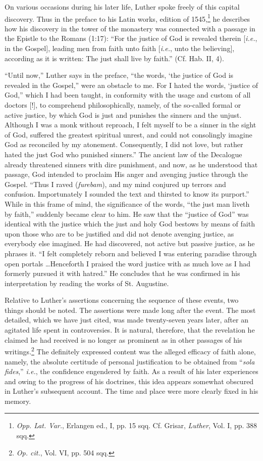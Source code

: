 On various occasions during his later life, Luther spoke freely
of this capital discovery. Thus in the preface to his Latin works,
edition of 1545,\footnote
{\textit{Opp. Lat. Var.}, Erlangen ed., I, pp. 15 sqq. Cf. Grisar, \textit{Luther}, Vol. I, pp. 388 sqq.}
he describes how his discovery in the tower of the
monastery was connected with a passage in the Epistle to the Romans
(1:17): “For the justice of God is revealed therein [\textit{i.e.}, in the
Gospel], leading men from faith unto faith [\textit{i.e.}, unto the believing],
according as it is written: The just shall live by faith.” (Cf. Hab. II, 4).

“Until now,” Luther says in the preface, “the words, ‘the justice
of God is revealed in the Gospel,” were an obstacle to me. For I hated
the words, ‘justice of God,” which I had been taught, in conformity
with the usage and custom of all doctors [!], to comprehend philosophically,
namely, of the so-called formal or active justice, by which
God is just and punishes the sinners and the unjust. Although I was
a monk without reproach, I felt myself to be a sinner in the sight of
God, suffered the greatest spiritual unrest, and could not consolingly
imagine God as reconciled by my atonement. Consequently, I did not
love, but rather hated the just God who punished sinners.” The ancient
law of the Decalogue already threatened sinners with dire punishment, and now, as he understood that passage, God intended to
proclaim His anger and avenging justice through the Gospel. “Thus
I raved (\textit{furebam}), and my mind conjured up terrors and confusion.
Importunately I sounded the text and thirsted to know its purport.”
While in this frame of mind, the significance of the words, “the just
man liveth by faith,” suddenly became clear to him. He saw that the
“justice of God” was identical with the justice which the just and
holy God bestows by means of faith upon those who are to be justified and
did not denote avenging justice, as everybody else imagined.
He had discovered, not active but passive justice, as he phrases it.
“I felt completely reborn and believed I was entering paradise
through open portals \dots Henceforth I praised the word justice
with as much love as I had formerly pursued it with hatred.” He
concludes that he was confirmed in his interpretation by reading the
works of St. Augustine.

Relative to Luther’s assertions concerning the sequence of these
events, two things should be noted. The assertions were made long
after the event. The most detailed, which we have just cited, was
made twenty-seven years later, after an agitated life spent in controversies.
It is natural, therefore, that the revelation he claimed he
had received is no longer as prominent as in other passages of his
writings.\footnote{\textit{Op. cit.}, Vol. VI, pp. 504 sqq.}
The definitely expressed content was the alleged efficacy of
faith alone, namely, the absolute certitude of personal justification to
be obtained from “\textit{sola fides},” \textit{i.e.}, the confidence engendered by faith.
As a result of his later experiences and owing to the progress of his
doctrines, this idea appears somewhat obscured in Luther’s subsequent
account. The time and place were more clearly fixed in his memory.

